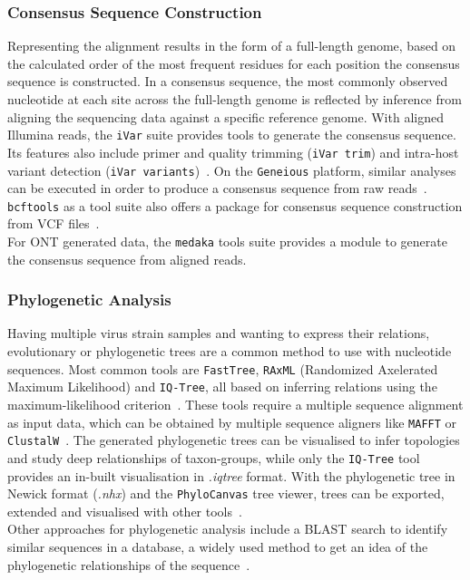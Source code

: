 \subsubsection*{Consensus Sequence Construction}
Representing the alignment results in the form of a full-length genome, based on the calculated order of the most frequent residues for each position the consensus sequence is constructed. In a consensus sequence, the most commonly observed nucleotide at each site across the full-length genome is reflected by inference from aligning the sequencing data against a specific reference genome. With aligned Illumina reads, the \texttt{iVar} suite provides tools to generate the consensus sequence. Its features also include primer and quality trimming (\texttt{iVar trim}) and intra-host variant detection (\texttt{iVar variants})~\cite{grubaugh2019amplicon}. On the \texttt{Geneious} platform, similar analyses can be executed in order to produce a consensus sequence from raw reads~\cite{kearse2012geneious}. \texttt{bcftools} as a tool suite also offers a package for consensus sequence construction from \ac{VCF} files~\cite{li2009sequence}.\\
For \ac{ONT} generated data, the \texttt{medaka} tools suite provides a module to generate the consensus sequence from aligned reads. 

\subsubsection*{Phylogenetic Analysis}
Having multiple virus strain samples and wanting to express their relations, evolutionary or phylogenetic trees are a common method to use with nucleotide sequences. Most common tools are \texttt{FastTree}, \texttt{RAxML} (Randomized Axelerated Maximum Likelihood) and \texttt{IQ-Tree}, all based on inferring relations using the maximum-likelihood criterion~\cite{price2009fasttree, stamatakis2014raxml, minh2020iq}. These tools require a multiple sequence alignment as input data, which can be obtained by multiple sequence aligners like \texttt{MAFFT} or \texttt{ClustalW}~\cite{katoh2013mafft, thompson2003multiple}. The generated phylogenetic trees can be visualised to infer topologies and study deep relationships of taxon-groups, while only the \texttt{IQ-Tree} tool provides an in-built visualisation in \textit{.iqtree} format. With the phylogenetic tree in Newick format (\textit{.nhx}) and the \texttt{PhyloCanvas} tree viewer, trees can be exported, extended and visualised with other tools~\cite{abudahab2021phylocanvas}. \\
Other approaches for phylogenetic analysis include a \ac{BLAST} search to identify similar sequences in a database, a widely used method to get an idea of the phylogenetic relationships of the sequence~\cite{altschul1997gapped}.

